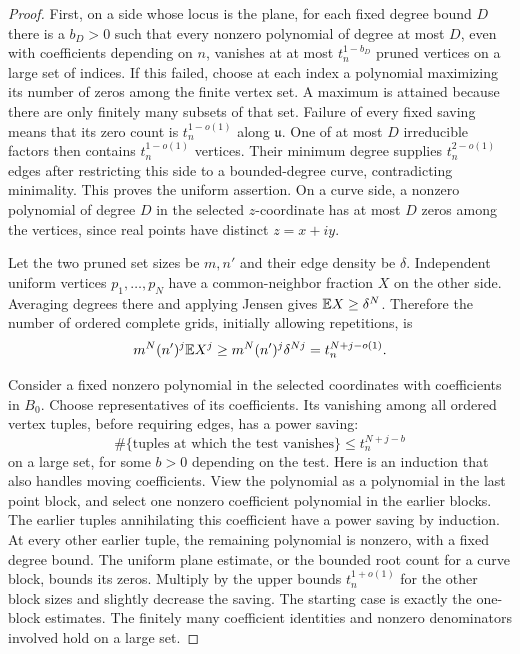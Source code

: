 \begin{proof}
First, on a side whose locus is the plane, for each fixed degree bound
\(D\) there is a \(b_D>0\) such that every nonzero polynomial of degree
at most \(D\), even with coefficients depending on \(n\), vanishes at
at most \(t_n^{1-b_D}\) pruned vertices on a large set of indices.
If this failed, choose at each index a polynomial maximizing its number
of zeros among the finite vertex set. A maximum is attained because
there are only finitely many subsets of that set. Failure of every
fixed saving means that its zero count is \(t_n^{1-o(1)}\) along
\(\mathfrak u\). One of at most \(D\) irreducible factors then contains
\(t_n^{1-o(1)}\) vertices. Their minimum degree supplies
\(t_n^{2-o(1)}\) edges after restricting this side to a bounded-degree
curve, contradicting minimality. This proves the uniform assertion.
On a curve side, a nonzero polynomial of degree \(D\) in the selected
\(z\)-coordinate has at most \(D\) zeros among the vertices, since real
points have distinct \(z=x+iy\).

Let the two pruned set sizes be \(m,n'\) and their edge density be
\(\delta\). Independent uniform vertices
\(p_1,\ldots,p_N\) have a common-neighbor fraction \(X\) on the other
side. Averaging degrees there and applying Jensen gives
\(\mathbb E X\ge\delta^N\). Therefore the number of ordered complete grids,
initially allowing repetitions, is
\begin{equation}\label{alg:grid-count}
 m^N(n')^j\mathbb E X^j
 \ge m^N(n')^j\delta^{Nj}
 =t_n^{N+j-o(1)}.
\end{equation}

Consider a fixed nonzero polynomial in the selected coordinates with
coefficients in \(B_0\). Choose representatives of its coefficients.
Its vanishing among all ordered vertex tuples, before requiring edges,
has a power saving:
\begin{equation}\label{alg:test-count}
 \#\{\text{tuples at which the test vanishes}\}
       \le t_n^{N+j-b}
\end{equation}
on a large set, for some \(b>0\) depending on the test. Here is an
induction that also handles moving coefficients. View the polynomial
as a polynomial in the last point block, and select one nonzero
coefficient polynomial in the earlier blocks. The earlier tuples
annihilating this coefficient have a power saving by induction. At
every other earlier tuple, the remaining polynomial is nonzero, with a
fixed degree bound. The uniform plane estimate, or the bounded root
count for a curve block, bounds its zeros. Multiply by the upper
bounds \(t_n^{1+o(1)}\) for the other block sizes and slightly decrease
the saving. The starting case is exactly the one-block estimates.
The finitely many coefficient identities and nonzero denominators
involved hold on a large set.


\end{proof}
